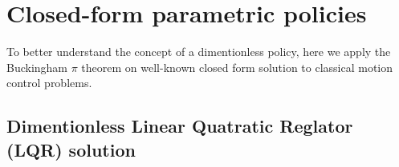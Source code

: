 \section{Closed-form parametric policies}

To better understand the concept of a dimentionless policy, here we apply the Buckingham $\pi$ theorem on well-known closed form solution to classical motion control problems.




\subsection{ Dimentionless Linear Quatratic Reglator (LQR) solution}
\label{sec:lqr}

